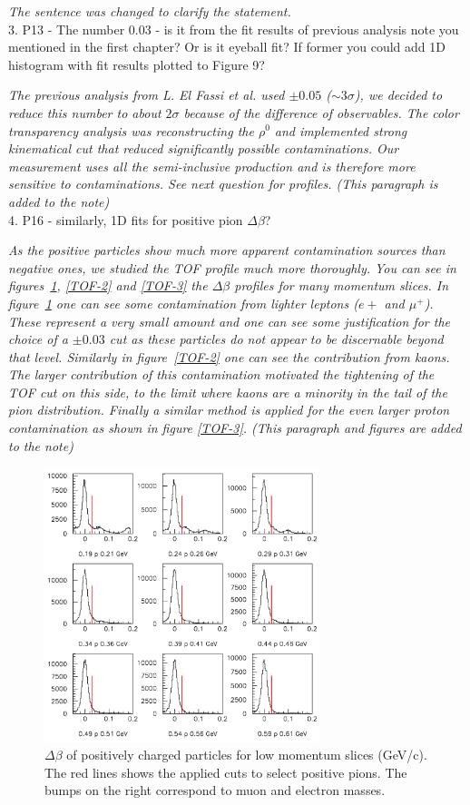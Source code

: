 \documentclass[12pt]{article}
\begin{document}
{\it The sentence was changed to clarify the statement.}\\

3.
P13 - The number 0.03 - is it from the fit results of previous analysis note you mentioned in 
the first chapter? Or is it eyeball fit? If former you could add 1D histogram with fit results 
plotted to Figure 9?

{\it The previous analysis from L. El Fassi et al. used $\pm 0.05$ ($\sim 3\sigma$), we decided
to reduce this number to about $2\sigma$ because of the difference of observables. The 
color transparency analysis was reconstructing the $\rho^0$ and implemented strong kinematical
cut that reduced significantly possible contaminations. Our measurement uses all the 
semi-inclusive production and is therefore more sensitive to contaminations. See next 
question for profiles. (This paragraph is added to the note)}\\

4.
P16 - similarly, 1D fits for positive pion $\Delta\beta$?

{\it As the positive particles show much more apparent contamination sources than negative 
ones, we studied 
the TOF profile much more thoroughly. You can see in figures~\ref{TOF-1}, \ref{TOF-2} and 
\ref{TOF-3} the $\Delta \beta$ profiles for many momentum slices. In figure~\ref{TOF-1}
one can see some contamination from lighter leptons ($e+$ and $\mu^+$). These represent
a very small amount and one can see some justification for the choice of a $\pm 0.03$
cut as these particles do not appear to be discernable beyond that level. Similarly
in figure~\ref{TOF-2} one can see the contribution from kaons. The larger contribution
of this contamination motivated the tightening of the TOF cut on this side, to the limit
where kaons are a minority in the tail of the pion distribution. Finally a similar 
method is applied for the even larger proton contamination as shown in figure \ref{TOF-3}.
 (This paragraph and figures are added to the note)}\\

\begin{figure}[tbp]
\centering
\includegraphics[width=8cm] {answer-fig/TofProfile1.png} 
\caption {$\Delta \beta$ of positively charged particles for low momentum slices 
(GeV/c). The red lines shows the applied cuts to select positive pions. The bumps on the right
correspond to muon and electron masses.}
\label{TOF-1}
\end{figure}
\end{document}
